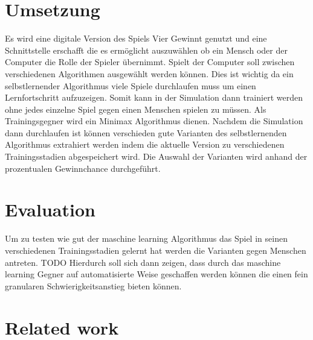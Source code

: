 \section{Umsetzung}

Es wird eine digitale Version des Spiels Vier Gewinnt genutzt und eine Schnittstelle erschafft die es ermöglicht auszuwählen ob ein Mensch oder der Computer die Rolle der Spieler übernimmt. Spielt der Computer soll zwischen verschiedenen Algorithmen ausgewählt werden können. Dies ist wichtig da ein selbstlernender Algorithmus viele Spiele durchlaufen muss um einen Lernfortschritt aufzuzeigen. Somit kann in der Simulation dann trainiert werden ohne jedes einzelne Spiel gegen einen Menschen spielen zu müssen. Als Trainingsgegner wird ein Minimax Algorithmus dienen. Nachdem die Simulation dann durchlaufen ist können verschieden gute Varianten des selbstlernenden Algorithmus extrahiert werden indem die aktuelle Version zu verschiedenen Trainingsstadien abgespeichert wird. Die Auswahl der Varianten wird anhand der prozentualen Gewinnchance durchgeführt. 

\section{Evaluation}
Um zu testen wie gut der maschine learning Algorithmus das Spiel in seinen verschiedenen Trainingsstadien gelernt hat werden die Varianten gegen Menschen antreten. 
\colorbox{red!30}{TODO}
Hierdurch soll sich dann zeigen, dass durch das maschine learning Gegner auf automatisierte Weise geschaffen werden können die einen fein granularen Schwierigkeitsanstieg bieten können.

\section{Related work}










